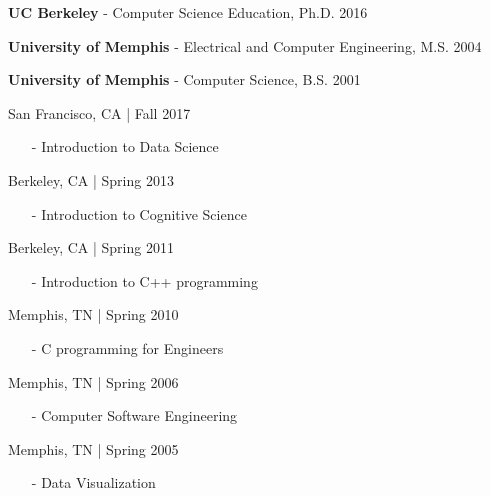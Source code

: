 \documentclass[11pt,article,oneside]{memoir}
\begin{document}
\ind \textbf{UC Berkeley} - Computer Science Education, Ph.D. \hfill 2016

\ind \textbf{University of Memphis} - Electrical and Computer Engineering, M.S. \hfill 2004

\ind \textbf{University of Memphis} - Computer Science, B.S. \hfill 2001

\bigskip

\medskip

 \hfill San Francisco, CA | Fall 2017
\begin{itemize}[noitemsep,nolistsep]
\item[-] Introduction to Data Science
\end{itemize}

 \hfill Berkeley, CA | Spring 2013
\begin{itemize}[noitemsep,nolistsep] 
\item[-] Introduction to Cognitive Science
\end{itemize} 

 \hfill Berkeley, CA | Spring 2011
\begin{itemize}[noitemsep,nolistsep] 
\item[-] Introduction to C++ programming
\end{itemize} 

 \hfill Memphis, TN | Spring 2010
\begin{itemize}[noitemsep,nolistsep]
\item[-] C programming for Engineers
\end{itemize}

 \hfill Memphis, TN | Spring 2006
\begin{itemize}[noitemsep,nolistsep]
\item[-] Computer Software Engineering
\end{itemize}

 \hfill Memphis, TN | Spring 2005
\begin{itemize}[noitemsep,nolistsep]
\item[-] Data Visualization
\end{itemize}
\end{document}
